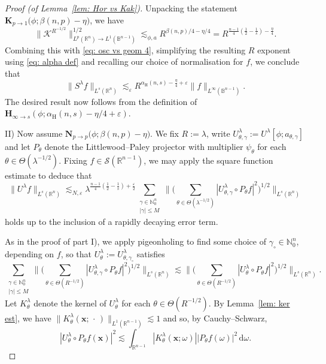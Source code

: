 \documentclass[reqno]{amsart}
\numberwithin{equation}{section}
\newcommand{\B}{\mathbb{B}}
\newcommand{\N}{\mathbb{N}}
\newcommand{\R}{\mathbb{R}}
\newcommand{\cK}{\mathcal{K}}
\newcommand{\cS}{\mathcal{S}}
\newcommand{\ud}{\mathrm{d}}
\newcommand{\bx}{\mathbf{x}}
\newcommand{\bH}{\mathbf{H}}
\newcommand{\bK}{\mathbf{K}}
\newcommand{\bN}{\mathbf{N}}
\theoremstyle{plain}
\theoremstyle{definition}
\begin{document}
\begin{proof}[Proof (of Lemma~\ref{lem: Hor vs Kak})]
Unpacking the statement $\bK_{p \to 1}\big(\phi;  \beta(n, p) - \eta\big)$, we have
\begin{equation*}
    \|\cK^{R^{-1/2}}\|_{L^p(\R^n) \to L^1(\B^{n-1})}^{1/2} \lesssim_{\phi,a} R^{\beta(n,p)/4 - \eta/4} = R^{\frac{n-1}{4}(\frac{1}{2} - \frac{1}{s}) - \frac{\eta}{4}}. 
\end{equation*}
Combining this with \eqref{eq: osc vs geom 4}, simplifying the resulting $R$ exponent using \eqref{eq: alpha def} and recalling our choice of normalisation for $f$, we conclude that
\begin{equation*}
     \|S^{\lambda}f\|_{L^s(\R^n)} \lesssim_{\varepsilon} R^{\alpha_{\mathrm{H}}(n, s) - \frac{\eta}{4} + \varepsilon}\|f\|_{L^{\infty}(\B^{n-1})}.
\end{equation*}
The desired result now follows from the definition of $\bH_{\infty \to s}(\phi; \alpha_{\mathrm{H}}(n, s) - \eta/4 + \varepsilon)$.\medskip 

\noindent II) Now assume $\bN_{p \to p}\big(\phi;  \beta(n, p) - \eta\big)$. We fix $R := \lambda$, write $U_{\theta,\gamma}^{\lambda} := U^{\lambda}[\phi; a_{\theta,\gamma}]$ and let $P_{\theta}$ denote the Littlewood--Paley projector with multiplier $\psi_{\theta}$ for each $\theta \in \Theta(\lambda^{-1/2})$. Fixing $f \in \cS(\R^{n-1})$, we may apply the square function estimate to deduce that 
\begin{equation}\label{eq: prop vs Nik 1}
  \|U^{\lambda}f\|_{L^s(\R^n)} \lesssim_{N,\varepsilon} \lambda^{\frac{n-1}{4}(\frac{1}{2} - \frac{1}{s}) + \frac{\varepsilon}{2}}  \sum_{\substack{\gamma \in \N_0^n \\ |\gamma| \leq M}} \Big\|\big(\sum_{\theta \in \Theta(\lambda^{-1/2})} |U_{\theta,\gamma}^{\lambda}\circ P_{\theta}f|^2 \big)^{1/2}\Big\|_{L^s(\R^n)}
\end{equation}
holds up to the inclusion of a rapidly decaying error term.

As in the proof of part I), we apply pigeonholing to find some choice of $\gamma_{\circ} \in \N^n_0$, depending on $f$, so that $U_{\theta}^{\lambda} := U_{\theta,\gamma_{\circ}}^{\lambda}$ satisfies
\begin{equation}\label{eq: prop vs Nik 2}
    \sum_{\substack{\gamma \in \N_0^n \\ |\gamma| \leq M}} \Big\|\big(\sum_{\theta \in \Theta(R^{-1/2})} |U_{\theta,\gamma}^{\lambda}\circ P_{\theta}f|^2 \big)^{1/2}\Big\|_{L^s(\R^n)} \lesssim \Big\|\big(\sum_{\theta \in \Theta(R^{-1/2})} |U_{\theta}^{\lambda}\circ P_{\theta}f|^2 \big)^{1/2}\Big\|_{L^s(\R^n)}.
\end{equation}
Let $K^{\lambda}_{\theta}$ denote the kernel of $U_{\theta}^{\lambda}$ for each $\theta \in \Theta(R^{-1/2})$. By Lemma~\ref{lem: ker est}, we have $\|K^{\lambda}_{\theta}(\bx;\,\cdot\,)\|_{L^1(\R^{n-1})} \lesssim 1$ and so, by Cauchy--Schwarz, 
\begin{equation*}
  |U_{\theta}^{\lambda}\circ P_{\theta}f(\bx)|^2 \lesssim \int_{\R^{n-1}} |K^{\lambda}_{\theta}(\bx;\omega)| |P_{\theta}f(\omega)|^2\,\ud \omega.
\end{equation*}


\end{proof}
\end{document}
